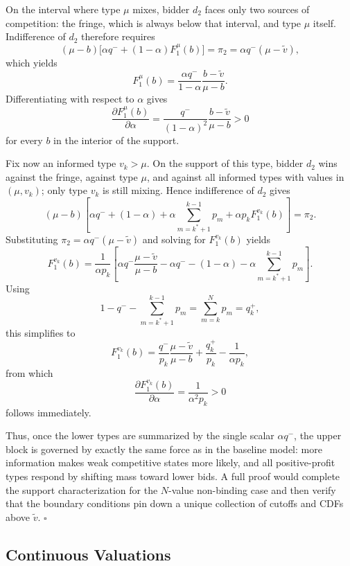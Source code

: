 \documentclass[11pt]{article}
\theoremstyle{plain}
\theoremstyle{definition}
\theoremstyle{plain}
\theoremstyle{plain}
\theoremstyle{plain}
\theoremstyle{plain}
\numberwithin{equation}{section}
\begin{document}
\noindent On the interval where type $\mu$ mixes, bidder $d_2$ faces only two sources of competition: the fringe, which is always below that interval, and type $\mu$ itself. Indifference of $d_2$ therefore requires
\[
(\mu-b)\big[\alpha q^- + (1-\alpha)F_1^{\mu}(b)\big] = \pi_2 = \alpha q^- (\mu-\tilde{v}),
\]
which yields
\[
F_1^{\mu}(b) = \frac{\alpha q^-}{1-\alpha}\frac{b-\tilde{v}}{\mu-b}.
\]
Differentiating with respect to $\alpha$ gives
\[
\frac{\partial F_1^{\mu}(b)}{\partial \alpha} = \frac{q^-}{(1-\alpha)^2}\frac{b-\tilde{v}}{\mu-b} > 0
\]
for every $b$ in the interior of the support.
\vspace{2mm}

\noindent Fix now an informed type $v_k > \mu$. On the support of this type, bidder $d_2$ wins against the fringe, against type $\mu$, and against all informed types with values in $(\mu, v_k)$; only type $v_k$ is still mixing. Hence indifference of $d_2$ gives
\[
(\mu-b)\left[\alpha q^- + (1-\alpha) + \alpha \sum_{m=k^*+1}^{k-1} p_m + \alpha p_k F_1^{v_k}(b)\right] = \pi_2.
\]
Substituting $\pi_2 = \alpha q^- (\mu-\tilde{v})$ and solving for $F_1^{v_k}(b)$ yields
\[
F_1^{v_k}(b) = \frac{1}{\alpha p_k}\left[\alpha q^- \frac{\mu-\tilde{v}}{\mu-b} - \alpha q^- - (1-\alpha) - \alpha \sum_{m=k^*+1}^{k-1} p_m\right].
\]
Using
\[
1 - q^- - \sum_{m=k^*+1}^{k-1} p_m = \sum_{m=k}^{N} p_m = q_k^+,
\]
this simplifies to
\[
F_1^{v_k}(b) = \frac{q^-}{p_k}\frac{\mu-\tilde{v}}{\mu-b} + \frac{q_k^+}{p_k} - \frac{1}{\alpha p_k},
\]
from which
\[
\frac{\partial F_1^{v_k}(b)}{\partial \alpha} = \frac{1}{\alpha^2 p_k} > 0
\]
follows immediately.
\vspace{2mm}

\noindent Thus, once the lower types are summarized by the single scalar $\alpha q^-$, the upper block is governed by exactly the same force as in the baseline model: more information makes weak competitive states more likely, and all positive-profit types respond by shifting mass toward lower bids. A full proof would complete the support characterization for the $N$-value non-binding case and then verify that the boundary conditions pin down a unique collection of cutoffs and CDFs above $\tilde{v}$. \hfill $\square$
\vspace{4mm}
 
\subsection{Continuous Valuations}\label{sect:continuous-values}
\end{document}
